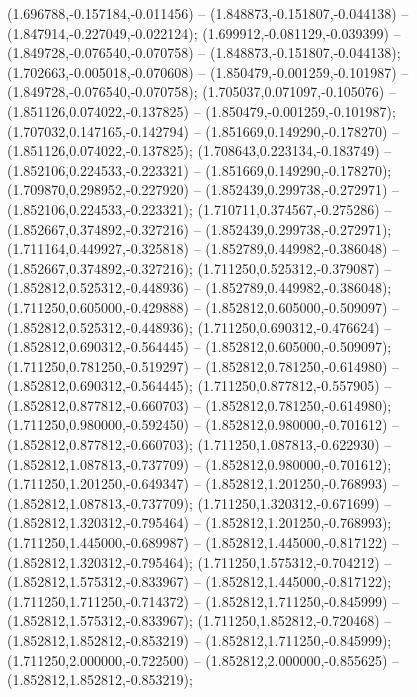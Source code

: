  (1.696788,-0.157184,-0.011456) -- (1.848873,-0.151807,-0.044138) -- (1.847914,-0.227049,-0.022124);
 (1.699912,-0.081129,-0.039399) -- (1.849728,-0.076540,-0.070758) -- (1.848873,-0.151807,-0.044138);
 (1.702663,-0.005018,-0.070608) -- (1.850479,-0.001259,-0.101987) -- (1.849728,-0.076540,-0.070758);
 (1.705037,0.071097,-0.105076) -- (1.851126,0.074022,-0.137825) -- (1.850479,-0.001259,-0.101987);
 (1.707032,0.147165,-0.142794) -- (1.851669,0.149290,-0.178270) -- (1.851126,0.074022,-0.137825);
 (1.708643,0.223134,-0.183749) -- (1.852106,0.224533,-0.223321) -- (1.851669,0.149290,-0.178270);
 (1.709870,0.298952,-0.227920) -- (1.852439,0.299738,-0.272971) -- (1.852106,0.224533,-0.223321);
 (1.710711,0.374567,-0.275286) -- (1.852667,0.374892,-0.327216) -- (1.852439,0.299738,-0.272971);
 (1.711164,0.449927,-0.325818) -- (1.852789,0.449982,-0.386048) -- (1.852667,0.374892,-0.327216);
 (1.711250,0.525312,-0.379087) -- (1.852812,0.525312,-0.448936) -- (1.852789,0.449982,-0.386048);
 (1.711250,0.605000,-0.429888) -- (1.852812,0.605000,-0.509097) -- (1.852812,0.525312,-0.448936);
 (1.711250,0.690312,-0.476624) -- (1.852812,0.690312,-0.564445) -- (1.852812,0.605000,-0.509097);
 (1.711250,0.781250,-0.519297) -- (1.852812,0.781250,-0.614980) -- (1.852812,0.690312,-0.564445);
 (1.711250,0.877812,-0.557905) -- (1.852812,0.877812,-0.660703) -- (1.852812,0.781250,-0.614980);
 (1.711250,0.980000,-0.592450) -- (1.852812,0.980000,-0.701612) -- (1.852812,0.877812,-0.660703);
 (1.711250,1.087813,-0.622930) -- (1.852812,1.087813,-0.737709) -- (1.852812,0.980000,-0.701612);
 (1.711250,1.201250,-0.649347) -- (1.852812,1.201250,-0.768993) -- (1.852812,1.087813,-0.737709);
 (1.711250,1.320312,-0.671699) -- (1.852812,1.320312,-0.795464) -- (1.852812,1.201250,-0.768993);
 (1.711250,1.445000,-0.689987) -- (1.852812,1.445000,-0.817122) -- (1.852812,1.320312,-0.795464);
 (1.711250,1.575312,-0.704212) -- (1.852812,1.575312,-0.833967) -- (1.852812,1.445000,-0.817122);
 (1.711250,1.711250,-0.714372) -- (1.852812,1.711250,-0.845999) -- (1.852812,1.575312,-0.833967);
 (1.711250,1.852812,-0.720468) -- (1.852812,1.852812,-0.853219) -- (1.852812,1.711250,-0.845999);
 (1.711250,2.000000,-0.722500) -- (1.852812,2.000000,-0.855625) -- (1.852812,1.852812,-0.853219);

